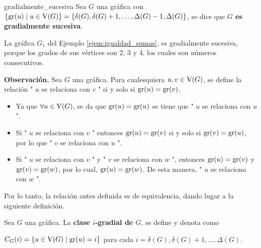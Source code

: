 \documentclass[fleqn, 11pt]{beamer}
\begin{document}
    \begin{definicion}{}{gradialmente_sucesiva}
        Sea $ G $ una gráfica con $ \left\lbrace \textnormal{gr}(u) \mid u \in \textnormal{V}(G) \right\rbrace = \left\lbrace \delta(G), \delta(G) + 1, \ldots, \Delta(G) - 1, \Delta(G) \right\rbrace $, se dice que \textbf{$ G $ es gradialmente sucesiva}.
    \end{definicion}

    \begin{ejemplo}{}{}
        La gráfica $ G_1 $ del Ejemplo \eqref{ejem:igualdad_sumas}, es gradialmente sucesiva, porque los grados de sus vértices son 2, 3 y 4, los cuales son números consecutivos.
    \end{ejemplo}

    \textbf{Observación.} Sea $ G $ una gráfica. Para cualesquiera $ u, v \in \textnormal{V}(G) $, se define la relación " $ u $ se relaciona con $ v $ " si y solo si $ \textnormal{gr}(u) = \textnormal{gr}(v) $.

    \begin{itemize}
        \item Ya que $ \forall u \in \textnormal{V}(G) $, se da que $ \textnormal{gr}(u) = \textnormal{gr}(u) $ se tiene que " $ u $ se relaciona con $ u $ ".
        \item Si " $ u $ se relaciona con $ v $ " entonces $ \textnormal{gr}(u) = \textnormal{gr}(v) $ si y solo si $ \textnormal{gr}(v) = \textnormal{gr}(u) $, por lo que " $ v $ se relaciona con $ u $ ".
        \item Si " $ u $ se relaciona con $ v $ " y " $ v $ se relaciona con $ w $ ", entonces $ \textnormal{gr}(u) = \textnormal{gr}(v) $ y $ \textnormal{gr}(v) = \textnormal{gr}(w) $, por lo cual, $ \textnormal{gr}(u) = \textnormal{gr}(w) $. De esta manera, " $ u $ se relaciona con $ w $ ".
    \end{itemize}

    Por lo tanto, la relación antes definida es de equivalencia, dando lugar a la siguiente definición.

    \begin{definicion}{}{}
        Sea $ G $ una gráfica. La \textbf{clase $ i $-gradial de $ G $}, se define y denota como \vspace{3mm}

        $ C_G(i) = \left\lbrace u \in \textnormal{V}(G) \mid \textnormal{gr}(u) = i \right\rbrace $ para cada $ i = \delta(G), \delta(G) + 1, \ldots, \Delta(G) $.
    \end{definicion}
\end{document}
